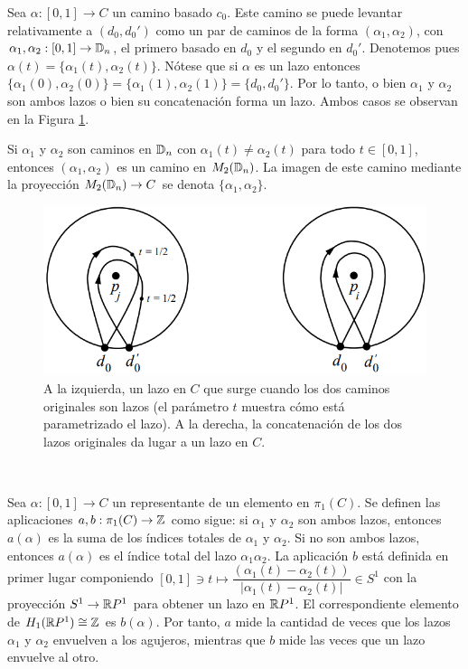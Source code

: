 \documentclass[TFG.tex]{subfiles}
\begin{document}

Sea $\alpha:[0,1]\to C$ un camino basado $c_0$. Este camino se puede levantar relativamente a $(d_0,d_0')$ como un par de caminos de la forma $(\alpha_1,\alpha_2)$, con $\alpha_1,\alpha_2:[0,1]\to\mathbb{D}_n$, el primero basado en $d_0$ y el segundo en $d_0'$. Denotemos pues $\alpha(t)=\{\alpha_1(t),\alpha_2(t)\}$. Nótese que si $\alpha$ es un lazo entonces $\{\alpha_1(0),\alpha_2(0)\}=\{\alpha_1(1),\alpha_2(1)\}=\{d_0,d_0'\}$. Por lo tanto, o bien $\alpha_1$ y $\alpha_2$ son ambos lazos o bien su concatenación forma un lazo. Ambos casos se observan en la Figura \ref{loop}. 




Si $\alpha_1$ y $\alpha_2$ son caminos en $\mathbb{D}_n$ con $\alpha_1(t)\neq\alpha_2(t)$ para todo $t\in[0,1]$, entonces $(\alpha_1,\alpha_2)$ es un camino en $M_2(\mathbb{D}_n)$. La imagen de este camino mediante la proyección $M_2(\mathbb{D}_n)\to C$ se denota $\{\alpha_1,\alpha_2\}$.

\begin{figure}[h!]
\includegraphics[scale=0.55]{Imagenes/loop}
\caption{A la izquierda, un lazo en $C$ que surge cuando los dos caminos originales son lazos (el parámetro $t$ muestra cómo está parametrizado el lazo). A la derecha, la concatenación de los dos lazos originales da lugar a un lazo en $C$.}\label{loop}
\end{figure}\ %

Sea $\alpha:[0,1]\to C$ un representante de un elemento en $\pi_1(C)$. Se definen las aplicaciones $a,b:\pi_1(C)\to\mathbb{Z}$ como sigue: si $\alpha_1$ y $\alpha_2$ son ambos lazos, entonces $a(\alpha)$ es la suma de los índices totales de $\alpha_1$ y $\alpha_2$. Si no son ambos lazos, entonces $a(\alpha)$ es el índice total del lazo $\alpha_1\alpha_2$. La aplicación $b$ está definida en primer lugar componiendo $[0,1]\ni t\mapsto \dfrac{(\alpha_1(t)-\alpha_2(t))}{|\alpha_1(t)-\alpha_2(t)|}\in S^1$ con la proyección $S^1\to \mathbb{R} P^1$ para obtener un lazo en $\mathbb{R} P^1$. El correspondiente elemento de $H_1(\mathbb{R} P^1)\cong\mathbb{Z}$ es $b(\alpha)$. Por tanto, $a$ mide la cantidad de veces que los lazos $\alpha_1$ y $\alpha_2$ envuelven a los agujeros, mientras que $b$ mide las veces que un lazo envuelve al otro.
\end{document}
